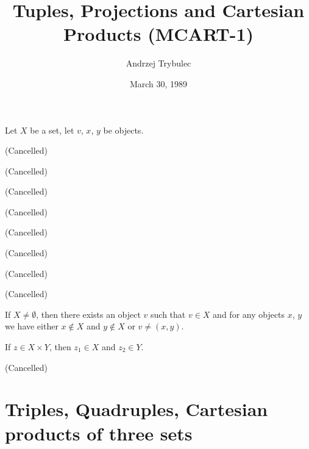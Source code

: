 \documentclass{article}
\title{Tuples, Projections and Cartesian Products (MCART-1)}
\author{Andrzej Trybulec}
\date{March 30, 1989}
\begin{document}
\maketitle

Let $X$ be a set, let $v$, $x$, $y$ be objects.
\begin{thm}
\item\label{mcart1:1} (Cancelled)
\item\label{mcart1:2} (Cancelled)
\item\label{mcart1:3} (Cancelled)
\item\label{mcart1:4} (Cancelled)
\item\label{mcart1:5} (Cancelled)
\item\label{mcart1:6} (Cancelled)
\item\label{mcart1:7} (Cancelled)
\item\label{mcart1:8} (Cancelled)
\item\label{mcart1:9} If $X\neq\emptyset$,
  then there exists an object $v$ such that $v\in X$
  and for any objects $x$, $y$ we have
  either $x\notin X$ and $y\notin X$ or $v\neq(x,y)$. 
\item\label{mcart1:10} If $z\in X\times Y$, then $z_{1}\in X$ and
  $z_{2}\in Y$.
\item\label{mcart1:11} (Cancelled)
\item\label{mcart1:12} 
\item\label{mcart1:13} 
\item\label{mcart1:14} 
\item\label{mcart1:15} 
\item\label{mcart1:16} 
\item\label{mcart1:17} 
\item\label{mcart1:18} 
\item\label{mcart1:19} 
\item\label{mcart1:20} 
\item\label{mcart1:21} 
\item\label{mcart1:22} 
\item\label{mcart1:23} 
\item\label{mcart1:24} 
\end{thm}

\section{Triples, Quadruples, Cartesian products of three sets}
\end{document}
